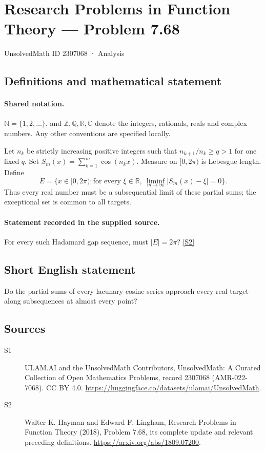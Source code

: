 \documentclass[11pt]{article}
\newcommand{\sref}[2]{\hyperlink{source:#1:#2}{[S#2]}}
\begin{document}
\setcounter{section}{2307067}
\section{Research Problems in Function Theory — Problem 7.68}\label{2307068}
{\small\sffamily UnsolvedMath ID 2307068 · Analysis}
\subsection{Definitions and mathematical statement}

\paragraph{Shared notation.}$\mathbb N=\{1,2,\ldots\}$, and $\mathbb Z,\mathbb Q,\mathbb R,\mathbb C$ denote the integers, rationals, reals and complex numbers. Any other conventions are specified locally.


Let $n_k$ be strictly increasing positive integers such that $n_{k+1}/n_k\ge q>1$ for one fixed $q$. Set $S_m(x)=\sum_{k=1}^m\cos(n_kx)$. Measure on $[0,2\pi)$ is Lebesgue length. Define
\[E=\{x\in[0,2\pi):\text{for every }\xi\in\mathbb R,
\ \liminf_{m\to\infty}|S_m(x)-\xi|=0\}.
\]
Thus every real number must be a subsequential limit of these partial sums; the exceptional set is common to all targets.
\paragraph{Statement recorded in the supplied source.}
For every such Hadamard gap sequence, must $|E|=2\pi$? \sref{2307068}{2}
\subsection{Short English statement}
Do the partial sums of every lacunary cosine series approach every real target along subsequences at almost every point?
\subsection{Sources}
\begin{description}
\item[\hypertarget{source:2307068:1}{S1}] ULAM.AI and the UnsolvedMath Contributors, UnsolvedMath: A Curated Collection of Open Mathematics Problems, record 2307068 (AMR-022-7068). CC BY 4.0. \url{https://huggingface.co/datasets/ulamai/UnsolvedMath}.
\item[\hypertarget{source:2307068:2}{S2}] Walter K. Hayman and Edward F. Lingham, Research Problems in Function Theory (2018), Problem 7.68, its complete update and relevant preceding definitions. \url{https://arxiv.org/abs/1809.07200}.
\end{description}
\label{end:2307068}
\end{document}
